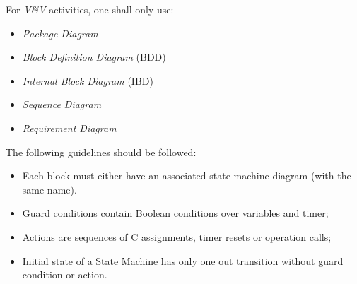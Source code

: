 For \emph{V\&V} activities, one shall only use:
\begin{itemize}
\item \emph{Package Diagram}
\item \emph{Block Definition Diagram} (BDD)
\item \emph{Internal Block Diagram} (IBD)
\item \emph{Sequence Diagram}
\item \emph{Requirement Diagram}
\end{itemize}

The following guidelines should be followed:
\begin{itemize}
\item Each block must either have an associated state machine diagram
  (with the same name).
\item Guard conditions contain Boolean conditions over variables and
  timer;
\item Actions are sequences of C assignments, timer resets or
  operation calls;
\item Initial state of a State Machine has only one out transition
  without guard condition or action.
\end{itemize}


